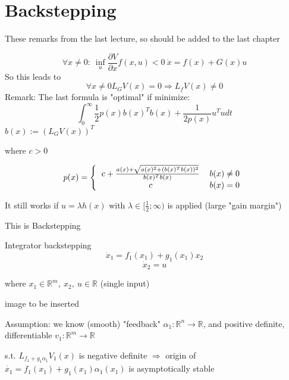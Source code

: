 \section{Backstepping}

These remarks from the last lecture, so should be added to the last chapter

\begin{equation*}
\forall x \neq 0: \ \inf_{u} \frac{\partial V}{\partial x} f(x,u) < 0 \ \dot{x} = f(x) + G(x)u
\end{equation*}
So this leads to
\begin{equation*}
\forall x \neq 0 L_G V(x) = 0 \Rightarrow L_fV(x) \neq 0
\end{equation*}
Remark: The last formula is "optimal" if minimize:
\begin{equation*}
\int_{0}^{\infty}\frac{1}{2}p(x)b(x)^Tb(x) + \frac{1}{2p(x)}u^Tudt
\end{equation*}
$b(x) := (L_GV(x))^T$

where $c > 0$

\begin{equation*}
p(x) = \left \{ 
\begin{tabular}{cc} 
$c + \frac{a(x) + \sqrt{a(x)^2 + (b(x)^Tb(x))^2}}{b(x)^Tb(x)}$ & $b(x) \neq 0$ \\ 
$c$ & $b(x) = 0$ 
\end{tabular} 
\right.
\end{equation*}

It still works if $u = \lambda h(x)$ with $\lambda \in [\frac{1}{2}; \infty)$ is applied (large "gain margin")

This is Backstepping

Integrator backstepping 
\begin{equation}\label{system_backstepping}
\dot x_1 = f_1(x_1) + g_1(x_1)x_2 
\end{equation}
\begin{equation*}
\dot x_2 = u
\end{equation*}

where $x_1 \in \mathbb{R}^m, \ x_2, \ u \in \mathbb{R}$ (single input)

image to be inserted

Assumption: we know (smooth) "feedback" $\alpha_1: \mathbb{R}^n \to \mathbb{R}$, and positive definite, differentiable $v_1: \mathbb{R}^m \to \mathbb{R}$

s.t. $L_{f_1 + g_1\alpha_1}V_1(x)$ is negative definite $\Rightarrow$ origin of $\dot{x_1} = f_1(x_1) + g_1(x_1)\alpha_1(x_1)$ is asymptotically stable

